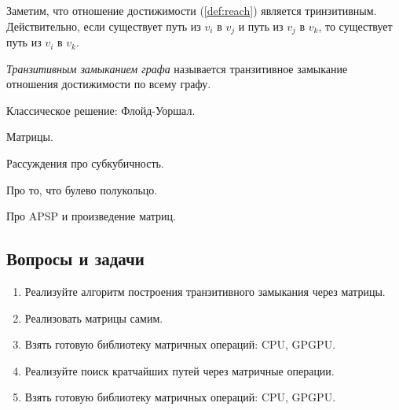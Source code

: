 Заметим, что отношение достижимости (\ref{def:reach}) является тринзитивным.
Действительно, если существует путь из $v_i$ в $v_j$ и путь из $v_j$ в $v_k$, то существует путь из $v_i$ в $v_k$.

\begin{definition}
  \textit{Транзитивным замыканием графа} называется транзитивное замыкание отношения достижимости по всему графу.
\end{definition}


Классическое решение: Флойд-Уоршал.

Матрицы.

Рассуждения про субкубичность.

Про то, что булево полукольцо.

Про APSP и произведение матриц.

\subsection{Вопросы и задачи}
\begin{enumerate}
  \item Реализуйте алгоритм построения транзитивного замыкания через матрицы.
  \item Реализовать матрицы самим.
  \item Взять готовую библиотеку матричных операций: CPU, GPGPU.
  \item Реализуйте поиск кратчайших путей через матричные операции.
  \item Взять готовую библиотеку матричных операций: CPU, GPGPU.
\end{enumerate}
